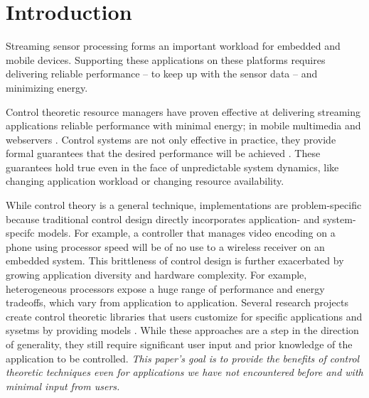 \section{Introduction}

Streaming sensor processing forms an important workload for embedded
and mobile devices. Supporting these applications on these platforms
requires delivering reliable performance -- to keep up with the sensor
data -- and minimizing energy.

Control theoretic resource managers have proven effective at
delivering streaming applications reliable performance with minimal
energy; \eg{} in mobile multimedia \cite{grace,grace2,Agilos} and
webservers \cite{}.  Control systems are not only effective in
practice, they provide formal guarantees that the desired performance
will be achieved \cite{ICSE2014,Hellerstein2004a}. These guarantees
hold true even in the face of unpredictable system dynamics, like
changing application workload or changing resource availability.

While control theory is a general technique, implementations are
problem-specific because traditional control design directly
incorporates application- and system-specifc models.  For example, a
controller that manages video encoding on a phone using processor
speed will be of no use to a wireless receiver on an embedded system.
This brittleness of control design is further exacerbated by growing
application diversity and hardware complexity.  For example,
heterogeneous processors expose a huge range of performance and energy
tradeoffs, which vary from application to application.  Several
research projects create control theoretic libraries that users
customize for specific applications and sysetms by providing models
\cite{POET,ControlWare}.  While these approaches are a step in the
direction of generality, they still require significant user input and
prior knowledge of the application to be controlled.  \emph{This
  paper's goal is to provide the benefits of control theoretic
  techniques even for applications we have not encountered before and
  with minimal input from users.}

